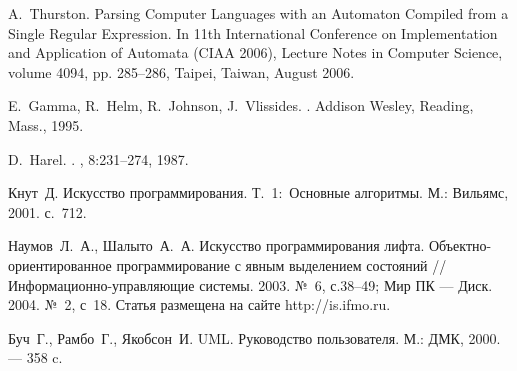 \documentclass[a4paper,12pt]{article}
\begin{document}
\begin{thebibliography}{99}
A.~Thurston.
Parsing Computer Languages with an Automaton Compiled from a Single Regular Expression.
In 11th International Conference on Implementation and Application of Automata (CIAA 2006), Lecture Notes in Computer Science, volume 4094, pp. 285--286, Taipei, Taiwan, August 2006.

E.~Gamma, R.~Helm, R.~Johnson, J.~Vlissides.
.
\newblock Addison Wesley, Reading, Mass., 1995.

D.~Harel.
.
, 8:231--274, 1987.

Кнут~Д.
Искусство программирования. Т.~1:~Основные алгоритмы.
М.: Вильямс, 2001. с.~712.

Наумов~Л.~А., Шалыто~А.~А.
Искусство программирования лифта. Объектно-ориентированное программирование с явным выделением состояний //Информационно-управляющие системы. 2003. №~6, с.38--49;
Мир ПК --- Диск. 2004. №~2, с~18.
Статья размещена на сайте http://is.ifmo.ru.

Буч~Г., Рамбо~Г., Якобсон~И.
UML. Руководство пользователя.
М.: ДМК, 2000. --- 358 c.

\end{thebibliography}
\end{document}
